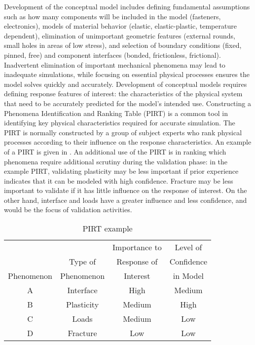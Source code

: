 Development of the conceptual model includes defining fundamental assumptions such as
how many components will be included in the model (fasteners, electronics),
models of material behavior (elastic, elastic-plastic, temperature dependent),
elimination of unimportant geometric features (external rounds, small holes in areas of low stress),
and
selection of boundary conditions (fixed, pinned, free) and component interfaces (bonded, frictionless, frictional).
Inadvertent elimination of important mechanical phenomena may lead to inadequate simulations, while focusing on essential physical processes ensures the model solves quickly and accurately.
Development of conceptual models requires defining response features of interest: the characteristics of the physical system that need to be accurately predicted for the model's intended use.
Constructing a Phenomena Identification and Ranking Table (PIRT) is a common tool in identifying key physical characteristics required for accurate simulation.
The PIRT is normally constructed by a group of subject experts who rank physical processes according to their influence on the response characteristics.
An example of a PIRT is given in .
An additional use of the PIRT is in ranking which phenomena require additional scrutiny during the validation phase: in the example PIRT, validating plasticity may be less important if prior experience indicates that it can be modeled with high confidence.
Fracture may be less important to validate if it has little influence on the response of interest.
On the other hand, interface and loads have a greater influence and less confidence, and would be the focus of validation activities.
\begin{table}[bp]
\caption[PIRT example]{\label{tab:pirt} PIRT example \citep{asme-vv}}
\centering
\begin{tabular}{cccc} \toprule
           &            & Importance to & Level of \\
           & Type of    & Response of   & Confidence \\
Phenomenon & Phenomenon & Interest      & in Model \\ \midrule

A & Interface & High & Medium \\
B & Plasticity & Medium & High \\
C & Loads & Medium & Low \\
D & Fracture & Low & Low \\ \bottomrule
\end{tabular}
\end{table}

